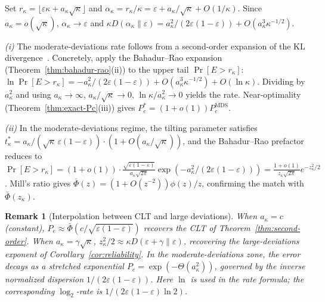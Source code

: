 \documentclass[journal]{IEEEtran}
\makeatletter
\newtheorem{remark}{Remark}[section]
\numberwithin{equation}{section}
\renewenvironment{proof}[1][\proofname]{\par
  \pushQED{\qed}%
  \normalfont \topsep6\p@\@plus6\p@\relax
  \trivlist
  \item[\hskip\labelsep
        \itshape
    #1\@addpunct{.}]\ignorespaces
}{%
  \popQED\endtrivlist\@endpefalse
}
\makeatother
\begin{document}
\begin{proof}
Set $r_\kappa=\lfloor\varepsilon\kappa+a_\kappa\sqrt\kappa\rfloor$
and $\alpha_\kappa=r_\kappa/\kappa
=\varepsilon+a_\kappa/\sqrt\kappa+O(1/\kappa)$.
Since $a_\kappa=o(\sqrt\kappa)$,
$\alpha_\kappa\to\varepsilon$ and
$\kappa D(\alpha_\kappa\|\varepsilon)
=a_\kappa^2/(2\varepsilon(1{-}\varepsilon))
+O(a_\kappa^3\kappa^{-1/2})$.

\emph{(i)}\;
The moderate-deviations rate follows from a second-order
expansion of the KL divergence~\cite[Theorem~3.7.1]{dembo2009large}.
Concretely, apply the Bahadur--Rao expansion
(Theorem~\ref{thm:bahadur-rao}(ii)) to the upper tail
$\Pr[E>r_\kappa]$:
$\ln\Pr[E>r_\kappa]
=-a_\kappa^2/(2\varepsilon(1{-}\varepsilon))
+O(a_\kappa^3\kappa^{-1/2})+O(\ln\kappa)$.
Dividing by $a_\kappa^2$ and using
$a_\kappa\to\infty$,
$a_\kappa/\sqrt\kappa\to 0$,
$\ln\kappa/a_\kappa^2\to 0$
yields the rate.
Near-optimality
(Theorem~\ref{thm:exact-Pc}(iii)) gives
$P_e^*=(1{+}o(1))P_e^{\mathrm{MDS}}$.

\emph{(ii)}\;
In the moderate-deviations regime, the tilting
parameter satisfies
$t^*_\kappa
=a_\kappa/(\sqrt\kappa\,\varepsilon(1{-}\varepsilon))
\cdot(1+O(a_\kappa/\sqrt\kappa))$,
and the Bahadur--Rao prefactor reduces to
$\Pr[E>r_\kappa]
=(1{+}o(1))\cdot
\frac{\sqrt{\varepsilon(1{-}\varepsilon)}}
     {a_\kappa\sqrt{2\pi}}
\exp(-a_\kappa^2/(2\varepsilon(1{-}\varepsilon)))
=\frac{1{+}o(1)}{z_\kappa\sqrt{2\pi}}e^{-z_\kappa^2/2}$.
Mill's ratio gives
$\bar\Phi(z)=(1{+}O(z^{-2}))\phi(z)/z$,
confirming the match with $\bar\Phi(z_\kappa)$.
\end{proof}

\begin{remark}[Interpolation between CLT and large deviations]
\label{rem:interpolation}
When $a_\kappa=c$ (constant),
$P_e\approx\bar\Phi(c/\sqrt{\varepsilon(1{-}\varepsilon)})$
recovers the CLT of Theorem~\ref{thm:second-order}.
When $a_\kappa=\gamma\sqrt\kappa$,
$z_\kappa^2/2\approx\kappa D(\varepsilon{+}\gamma\|\varepsilon)$,
recovering the large-deviations exponent of
Corollary~\ref{cor:reliability}.
In the moderate-deviations zone, the error decays as a
\emph{stretched exponential}
$P_e=\exp(-\Theta(a_\kappa^2))$,
governed by the inverse normalized dispersion
$1/(2\varepsilon(1{-}\varepsilon))$.
Here $\ln$ is used in the rate formula; the corresponding
$\log_2$-rate is $1/(2\varepsilon(1{-}\varepsilon)\ln 2)$.
\end{remark}

\end{document}
